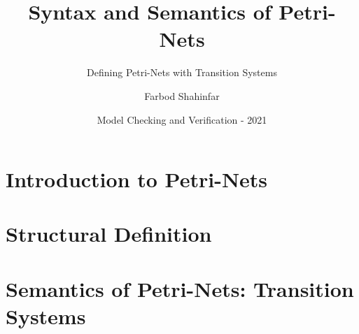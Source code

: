 \documentclass{beamer}
\title[Petri-Nets] %
{Syntax and Semantics of Petri-Nets}
\subtitle{Defining Petri-Nets with Transition Systems}
\author[Author, Shahinfar]
{Farbod Shahinfar} %
\institute[\uniname]
{
    Department of Computer Engineering\newline
    \uniname
}
\date[Sharif 2021] %
{Model Checking and Verification - 2021}
\begin{document}
    \begin{frame}[plain]\titlepage\end{frame}

\section[Introduction]{Introduction to Petri-Nets}


\section[Structural Definition]{Structural Definition}


\section[Semantics]{Semantics of Petri-Nets: Transition Systems}


\end{document}
